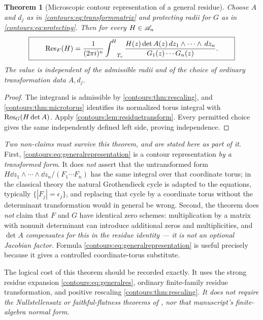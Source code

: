 \documentclass[11pt,letterpaper]{article}
\newtheorem{theorem}{Theorem}[section]
\theoremstyle{definition}
\theoremstyle{remark}
\newcommand{\HInt}{\mathop{\int^{\!H}}\nolimits}
\numberwithin{equation}{section}
\begin{document}
\begin{theorem}[Microscopic contour representation of a general residue]
\label{contours:thm:generalrepresentation}
Choose $A$ and $d_j$ as in \eqref{contours:eq:transformmatrix} and protecting radii
for $G$ as in \eqref{contours:eq:protecting}. Then for every $H\in\mathscr A_n$
\begin{equation}\label{contours:eq:generalrepresentation}
 \boxed{\qquad
 \Res_F(H)=\frac1{(2\pi i)^n}\HInt_{T_r}
 \frac{H(z)\det A(z)\dd z_1\wedge\cdots\wedge \dd z_n}{G_1(z)\cdots G_n(z)} .
 \qquad}
\end{equation}
The value is independent of the admissible radii and of the choice of ordinary
transformation data $A,d_j$.
\end{theorem}
\begin{proof}
The integrand is admissible by \cref{contours:thm:rescaling}, and
\cref{contours:thm:microtorus} identifies its normalized torus integral with
$\operatorname{Res}_G(H\det A)$. Apply \cref{contours:lem:residuetransform}. Every permitted
choice gives the same independently defined left side, proving independence.
\end{proof}

\emph{Two non-claims must survive this theorem, and are stated here as part of it.}
First, \eqref{contours:eq:generalrepresentation} is a contour representation
\emph{by a transformed form}. It does \emph{not} assert that the untransformed form
$H\dd z_1\wedge\cdots\wedge \dd z_n/(F_1\cdots F_n)$ has the same integral over that
coordinate torus; in the classical theory the natural Grothendieck cycle is adapted
to the equations, typically $\{|F_j|=\epsilon_j\}$, and replacing that cycle by a
coordinate torus without the determinant transformation would in general be wrong.
Second, the theorem does \emph{not} claim that $F$ and $G$ have identical zero
schemes: multiplication by a matrix with nonunit determinant can introduce
additional zeros and multiplicities, and \emph{$\det A$ compensates for this in the
residue identity --- it is not an optional Jacobian factor.} Formula
\eqref{contours:eq:generalrepresentation} is useful precisely because it gives a
controlled coordinate-torus substitute.

The logical cost of this theorem should be recorded exactly. It uses the strong
residue expansion \eqref{contours:eq:generalres}, ordinary finite-family residue
transformation, and positive rescaling \cref{contours:thm:rescaling}. \emph{It does
not require the Nullstellensatz or faithful-flatness theorems of \cite{Geometry},
nor that manuscript's finite-algebra normal form.}
\end{document}
